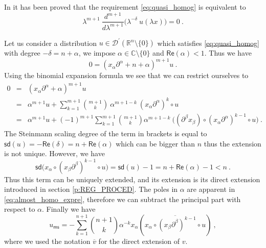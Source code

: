 \documentclass[11pt]{book}
\newcommand{\ms}{\mathsf{ms}}
\newcommand{\sd}{\mathsf{sd}}
\renewcommand{\Re}{\mathsf{Re}}
\newcommand{\Dcal}{\mathcal{D}}
\newcommand{\Cbb}{\mathbb{C}}
\newcommand{\Rbb}{\mathbb{R}}
\theoremstyle{break}
\begin{document}
In \cite{duetsch_causal_2004} it has been proved that the requirement \eqref{eq:quasi_homog} is equivalent to 
%
\begin{equation}
\lambda^{m+1} \ \dfrac{d^{m+1}}{d\lambda^{m+1}} \bigg( \lambda^{-\delta}  \ u(\lambda x ) \bigg) = 0 \ .
\label{eq:quasi_euler_numeric}
\end{equation}


Let us consider a distribution $u \in \Dcal^\prime(\Rbb^n\setminus\{0\})$ which satisfies \eqref{eq:quasi_homog} with degree $-\delta = n + \alpha$, we impose $\alpha\in\Cbb\setminus\{0\}$ and $\Re(\alpha)<1$. Thus we have
%
\begin{equation*}
0 = \left( x_\alpha \partial^\alpha + n + \alpha \right)^{m+1} u \ .
\end{equation*}
%
Using the binomial expansion formula we see that we can restrict ourselves to 
%
\begin{eqnarray}
0 &=&\left(x_\alpha \partial^\alpha + \alpha \right)^{m+1} u \nonumber \\
&=& \alpha^{m+1} u + \sum_{k=1}^{m+1} \binom{m+1}{k} \ \alpha^{m+1-k} \ \left(x_\alpha \partial^\alpha \right)^{k} \circ u \nonumber \\
&=& \alpha^{m+1} u + (-1)^{m+1} \sum_{k=1}^{m+1} \binom{m+1}{k} \alpha^{m+1-k} \ \bigg( \left(\partial^\beta x_\beta \right) \circ \left(x_\alpha \partial^\alpha \right)^{k-1} \circ u \bigg) \ .
\label{eq:almost_homo_expre}
\end{eqnarray}
%
The Steinmann scaling degree of the term in brackets is equal to $\sd(u) = - \Re(\delta)=n+\Re(\alpha)$ which can be bigger than $n$ thus the extension is not unique. However, we have
%
\begin{equation*}
\sd\bigg(x_\alpha \circ \left(x_\beta \partial^\beta \right)^{k-1} \circ u\bigg) = \sd(u) - 1 = n + \Re(\alpha) - 1 < n \ .
\end{equation*}
%
Thus this term can be uniquely extended, and its extension is its direct extension introduced in section \ref{p:REG_PROCED}. The poles in $\alpha$ are apparent in \eqref{eq:almost_homo_expre}, therefore we can subtract the principal part with respect to $\alpha$. Finally we have
%
\begin{equation*}
u_\ms = - \sum_{k=1}^{n+1} \binom{n+1}{k} \alpha^{-k} x_\alpha \left( \overline{ x_\alpha \circ \left(x_\beta \partial^\beta \right)^{k-1} \circ u } \right) \ , 
\end{equation*}
%
where we used the notation $\overline{v}$ for the direct extension of $v$.
\end{document}
